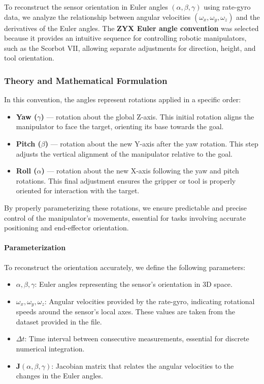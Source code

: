 \documentclass[12pt]{article}
\begin{document}
To reconstruct the sensor orientation in Euler angles \((\alpha, \beta, \gamma)\) using rate-gyro data, we analyze the relationship between angular velocities \((\omega_x, \omega_y, \omega_z)\) and the derivatives of the Euler angles. The \textbf{ZYX Euler angle convention} was selected because it provides an intuitive sequence for controlling robotic manipulators, such as the Scorbot VII, allowing separate adjustments for direction, height, and tool orientation.

\subsubsection{Theory and Mathematical Formulation}

In this convention, the angles represent rotations applied in a specific order:
\begin{itemize}
    \item \textbf{Yaw (\(\gamma\))} — rotation about the global Z-axis. This initial rotation aligns the manipulator to face the target, orienting its base towards the goal.
    \item \textbf{Pitch (\(\beta\))} — rotation about the new Y-axis after the yaw rotation. This step adjusts the vertical alignment of the manipulator relative to the goal.
    \item \textbf{Roll (\(\alpha\))} — rotation about the new X-axis following the yaw and pitch rotations. This final adjustment ensures the gripper or tool is properly oriented for interaction with the target.
\end{itemize}

By properly parameterizing these rotations, we ensure predictable and precise control of the manipulator's movements, essential for tasks involving accurate positioning and end-effector orientation.

\paragraph{Parameterization}
To reconstruct the orientation accurately, we define the following parameters:
\begin{itemize}
    \item \(\alpha, \beta, \gamma\): Euler angles representing the sensor's orientation in 3D space.
    \item \(\omega_x, \omega_y, \omega_z\): Angular velocities provided by the rate-gyro, indicating rotational speeds around the sensor’s local axes. These values are taken from the dataset provided in the file.
    \item \(\Delta t\): Time interval between consecutive measurements, essential for discrete numerical integration.
    \item \(\mathbf{J}(\alpha, \beta, \gamma)\): Jacobian matrix that relates the angular velocities to the changes in the Euler angles.
\end{itemize}
\end{document}
